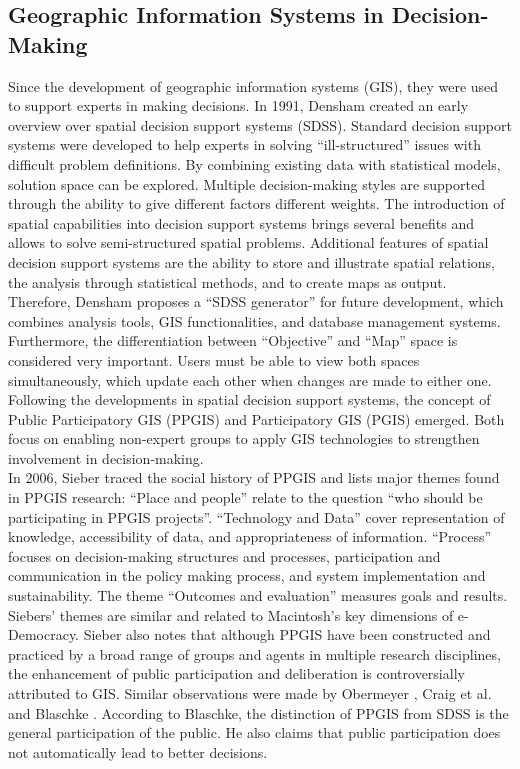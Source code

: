\subsection{Geographic Information Systems in Decision-Making}
\label{subchap:gis_stuff}
Since the development of geographic information systems (GIS), they were used to support experts in making decisions. In 1991, Densham \cite{densham_sdss} created an early overview over spatial decision support systems (SDSS). Standard decision support systems were developed to help experts in solving ``ill-structured'' issues with difficult problem definitions. By combining existing data with statistical models, solution space can be explored. Multiple decision-making styles are supported through the ability to give different factors different weights. The introduction of spatial capabilities into decision support systems brings several benefits and allows to solve semi-structured spatial problems. Additional features of spatial decision support systems are the ability to store and illustrate spatial relations, the analysis through statistical methods, and to create maps as output. Therefore, Densham proposes a ``SDSS generator'' for future development, which combines analysis tools, GIS functionalities, and database management systems. Furthermore, the differentiation between ``Objective'' and ``Map'' space is considered very important. Users must be able to view both spaces simultaneously, which update each other when changes are made to either one.\\
Following the developments in spatial decision support systems, the concept of Public Participatory GIS (PPGIS) and Participatory GIS (PGIS) emerged. Both focus on enabling non-expert groups to apply GIS technologies to strengthen involvement in decision-making.\\
In 2006, Sieber \cite{Sieber2006_PublicParticipationGIS} traced the social history of PPGIS and lists major themes found in PPGIS research: ``Place and people'' relate to the question ``who should be participating in PPGIS projects''. ``Technology and Data'' cover representation of knowledge, accessibility of data, and appropriateness of information. ``Process'' focuses on decision-making structures and processes, participation and communication in the policy making process, and system implementation and sustainability. The theme ``Outcomes and evaluation'' measures goals and results. Siebers' themes are similar and related to Macintosh's \cite{Macintosh2004_eParticipation_characterization} key dimensions of e-Democracy. Sieber also notes that although PPGIS have been constructed and practiced by a broad range of groups and agents in multiple research disciplines, the enhancement of public participation and deliberation is controversially attributed to GIS. Similar observations were made by Obermeyer \cite{obermeyer1998evolution}, Craig et al. \cite{Weiner2002_Participation_and_GIS_eigentlich_Craig} and Blaschke \cite{Blaschke2004_PGIS_critically_revised}. According to Blaschke, the distinction of PPGIS from SDSS is the general participation of the public. He also claims that public participation does not automatically lead to better decisions.\\
